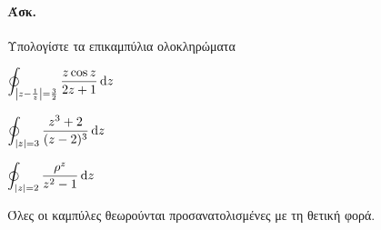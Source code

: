\documentclass[12pt,a4paper,titlepage,fleqn]{article}
\begin{document}
    \paragraph{Άσκ.}
    Υπολογίστε τα επικαμπύλια ολοκληρώματα
    \begin{enumgreekparen}
    	\item \( \displaystyle
    	\oint_{\left|z-\frac{1}{z}\right|=\frac{3}{2}}
    	\frac{z\cos z}{2z+1}\dif z
    	 \)
    	\item \( \displaystyle
    	\oint_{|z|=3} \frac{z^3+2}{(z-2)^3}\dif z
    	 \)
    	\item \( \displaystyle
    	\oint_{|z|=2} \frac{\rho^z}{z^2-1} \dif z
    	 \)
    \end{enumgreekparen}
    Όλες οι καμπύλες θεωρούνται προσανατολισμένες με τη θετική φορά.
    
    \paragraph{}
    
\end{document}
